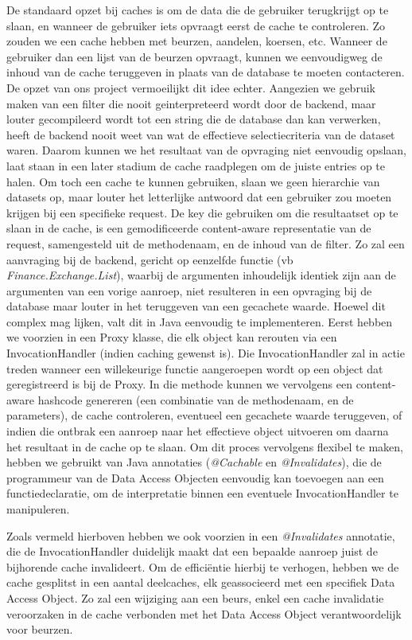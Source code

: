 De standaard opzet bij caches is om de data die de gebruiker terugkrijgt op te slaan, en wanneer de gebruiker iets opvraagt eerst de cache te controleren. Zo zouden we een cache hebben met beurzen, aandelen, koersen, etc. Wanneer de gebruiker dan een lijst van de beurzen opvraagt, kunnen we eenvoudigweg de inhoud van de cache teruggeven in plaats van de database te moeten contacteren.
De opzet van ons project vermoeilijkt dit idee echter. Aangezien we gebruik maken van een filter die nooit geinterpreteerd wordt door de backend, maar louter gecompileerd wordt tot een string die de database dan kan verwerken, heeft de backend nooit weet van wat de effectieve selectiecriteria van de dataset waren. Daarom kunnen we het resultaat van de opvraging niet eenvoudig opslaan, laat staan in een later stadium de cache raadplegen om de juiste entries op te halen. Om toch een cache te kunnen gebruiken, slaan we geen hierarchie van datasets op, maar louter het letterlijke antwoord dat een gebruiker zou moeten krijgen bij een specifieke request. De key die gebruiken om die resultaatset op te slaan in de cache, is een gemodificeerde content-aware representatie van de request, samengesteld uit de methodenaam, en de inhoud van de filter. Zo zal een aanvraging bij de backend, gericht op eenzelfde functie (vb \emph{Finance.Exchange.List}), waarbij de argumenten inhoudelijk identiek zijn aan de argumenten van een vorige aanroep, niet resulteren in een opvraging bij de database maar louter in het teruggeven van een gecachete waarde.
Hoewel dit complex mag lijken, valt dit in Java eenvoudig te implementeren. Eerst hebben we voorzien in een Proxy klasse, die elk object kan rerouten via een InvocationHandler (indien caching gewenst is). Die InvocationHandler zal in actie treden wanneer een willekeurige functie aangeroepen wordt op een object dat geregistreerd is bij de Proxy. In die methode kunnen we vervolgens een content-aware hashcode genereren (een combinatie van de methodenaam, en de parameters), de cache controleren, eventueel een gecachete waarde teruggeven, of indien die ontbrak een aanroep naar het effectieve object uitvoeren om daarna het resultaat in de cache op te slaan. Om dit proces vervolgens flexibel te maken, hebben we gebruikt van Java annotaties (\emph{@Cachable} en \emph{@Invalidates}), die de programmeur van de Data Access Objecten eenvoudig kan toevoegen aan een functiedeclaratie, om de interpretatie binnen een eventuele InvocationHandler te manipuleren.

Zoals vermeld hierboven hebben we ook voorzien in een \emph{@Invalidates} annotatie, die de InvocationHandler duidelijk maakt dat een bepaalde aanroep juist de bijhorende cache invalideert. Om de effici\"entie hierbij te verhogen, hebben we de cache gesplitst in een aantal deelcaches, elk geassocieerd met een specifiek Data Access Object. Zo zal een wijziging aan een beurs, enkel een cache invalidatie veroorzaken in de cache verbonden met het Data Access Object verantwoordelijk voor beurzen.

